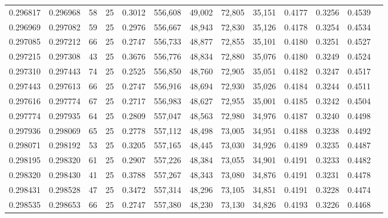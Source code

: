 \begin{tabular}{rrrrrrrrrrrrr}
0.296817 & 0.296968 &    58 &  25 &                                     0.3012 & 556,608 &  49,002 &  72,805 &  35,151 & 0.4177 & 0.3256 & 0.4539 \\
0.296969 & 0.297082 &    59 &  25 &                                     0.2976 & 556,667 &  48,943 &  72,830 &  35,126 & 0.4178 & 0.3254 & 0.4534 \\
0.297085 & 0.297212 &    66 &  25 &                                     0.2747 & 556,733 &  48,877 &  72,855 &  35,101 & 0.4180 & 0.3251 & 0.4527 \\
0.297215 & 0.297308 &    43 &  25 &                                     0.3676 & 556,776 &  48,834 &  72,880 &  35,076 & 0.4180 & 0.3249 & 0.4524 \\
0.297310 & 0.297443 &    74 &  25 &                                     0.2525 & 556,850 &  48,760 &  72,905 &  35,051 & 0.4182 & 0.3247 & 0.4517 \\
0.297443 & 0.297613 &    66 &  25 &                                     0.2747 & 556,916 &  48,694 &  72,930 &  35,026 & 0.4184 & 0.3244 & 0.4511 \\
0.297616 & 0.297774 &    67 &  25 &                                     0.2717 & 556,983 &  48,627 &  72,955 &  35,001 & 0.4185 & 0.3242 & 0.4504 \\
0.297774 & 0.297935 &    64 &  25 &                                     0.2809 & 557,047 &  48,563 &  72,980 &  34,976 & 0.4187 & 0.3240 & 0.4498 \\
0.297936 & 0.298069 &    65 &  25 &                                     0.2778 & 557,112 &  48,498 &  73,005 &  34,951 & 0.4188 & 0.3238 & 0.4492 \\
0.298071 & 0.298192 &    53 &  25 &                                     0.3205 & 557,165 &  48,445 &  73,030 &  34,926 & 0.4189 & 0.3235 & 0.4487 \\
0.298195 & 0.298320 &    61 &  25 &                                     0.2907 & 557,226 &  48,384 &  73,055 &  34,901 & 0.4191 & 0.3233 & 0.4482 \\
0.298320 & 0.298430 &    41 &  25 &                                     0.3788 & 557,267 &  48,343 &  73,080 &  34,876 & 0.4191 & 0.3231 & 0.4478 \\
0.298431 & 0.298528 &    47 &  25 &                                     0.3472 & 557,314 &  48,296 &  73,105 &  34,851 & 0.4191 & 0.3228 & 0.4474 \\
0.298535 & 0.298653 &    66 &  25 &                                     0.2747 & 557,380 &  48,230 &  73,130 &  34,826 & 0.4193 & 0.3226 & 0.4468 \\

\end{tabular}
